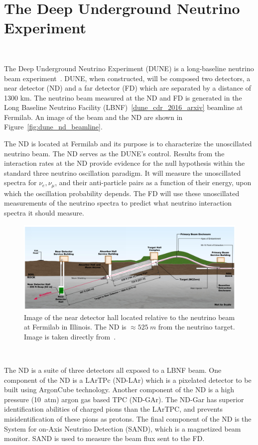 \section{The Deep Underground Neutrino Experiment}~\label{sec:dune}

The Deep Underground Neutrino Experiment (DUNE) is a long-baseline neutrino beam experiment~\citep{DUNE_TDR_V1_Abi_2020, DUNE_FD_TDRv2_2020, DUNE_TDRv3_Abi_2020, DUNE-FD_TDRv4:Abi_2020}.
DUNE, when constructed, will be composed two detectors, a near detector (ND) and a far detector (FD) which are separated by a distance of 1300 km.
The neutrino beam measured at the ND and FD is generated in the Long Baseline Neutrino Facility (LBNF)~\ref{dune_cdr_2016_arxiv} beamline at Fermilab.
An image of the beam and the ND are shown in Figure~\ref{fig:dune_nd_beamline}.

The ND is located at Fermilab and its purpose is to characterize the unoscillated neutrino beam.
The ND serves as the DUNE's control.
Results from the interaction rates at the ND provide evidence for the null hypothesis within the standard three neutrino oscillation paradigm.
It will measure the unoscillated spectra for $\nu_{e}, \nu_{\mu}$, and their anti-particle pairs as a function of their energy, upon which the oscillation probability depends.
The FD will use these unoscillated measurements of the neutrino spectra to predict what neutrino interaction spectra it should measure.

\begin{figure}[]
\centering
\includegraphics[width=\textwidth]{images/dune_nd_beamline_tdrv1.png}
\caption{Image of the near detector hall located relative to the neutrino beam at Fermilab in Illinois.
The ND is $\approx 525~\unit{m}$ from the neutrino target.
Image is taken directly from~\citep{DUNE_TDR_V1_Abi_2020}.
}
\end{figure}~\label{fig:dune_nd_beamline}

The ND is a suite of three detectors all exposed to a LBNF beam.
One component of the ND is a LArTPc (ND-LAr) which is a pixelated detector to be built using ArgonCube technology.
Another component of the ND is a high pressure (10~\unit{atm}) argon gas based TPC (ND-GAr).
The ND-Gar has superior identification abilities of charged pions than the LArTPC, and prevents misidentification of these pions as protons.
The final component of the ND is the System for on-Axis Neutrino Detection (SAND), which is a magnetized beam monitor.
SAND is used to measure the beam flux sent to the FD.

